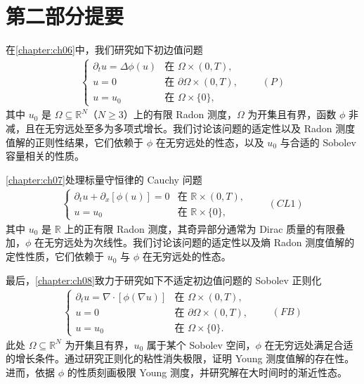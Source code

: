 \documentclass[../main.tex]{subfiles}
\begin{document}
\section*{第二部分提要}\label{section:part2-outline}

在\cref{chapter:ch06}中，我们研究如下初边值问题
\begin{align*}
\begin{cases}
\partial_t u = \Delta\phi(u) & \text{在 }\Omega\times(0,T),\\
u=0 & \text{在 }\partial\Omega\times(0,T),\\
u=u_0 & \text{在 }\Omega\times\{0\},
\end{cases}
\qquad(P)
\end{align*}
其中 $u_0$ 是 $\Omega\subseteq\mathbb{R}^N$（$N\geqslant3$）上的有限 Radon 测度，$\Omega$ 为开集且有界，函数 $\phi$ 非减，且在无穷远处至多为多项式增长。我们讨论该问题的适定性以及 Radon 测度值解的正则性结果，它们依赖于 $\phi$ 在无穷远处的性态，以及 $u_0$ 与合适的 Sobolev 容量相关的性质。

\cref{chapter:ch07}处理标量守恒律的 Cauchy 问题
\begin{align*}
\begin{cases}
\partial_t u + \partial_x[\phi(u)] = 0 & \text{在 }\mathbb{R}\times(0,T),\\
u=u_0 & \text{在 }\mathbb{R}\times\{0\},
\end{cases}
\qquad(CL1)
\end{align*}
其中 $u_0$ 是 $\mathbb{R}$ 上的正有限 Radon 测度，其奇异部分通常为 Dirac 质量的有限叠加，$\phi$ 在无穷远处为次线性。我们讨论该问题的适定性以及熵 Radon 测度值解的定性性质，它们依赖于 $u_0$ 与 $\phi$ 在无穷远处的性态。

最后，\cref{chapter:ch08}致力于研究如下不适定初边值问题的 Sobolev 正则化
\begin{align*}
\begin{cases}
\partial_t u = \nabla\cdot[\phi(\nabla u)] & \text{在 }\Omega\times(0,T),\\
u=0 & \text{在 }\partial\Omega\times(0,T),\\
u=u_0 & \text{在 }\Omega\times\{0\}.
\end{cases}
\qquad(FB)
\end{align*}
此处 $\Omega\subseteq\mathbb{R}^N$ 为开集且有界，$u_0$ 属于某个 Sobolev 空间，$\phi$ 在无穷远处满足合适的增长条件。通过研究正则化的粘性消失极限，证明 Young 测度值解的存在性。进而，依据 $\phi$ 的性质刻画极限 Young 测度，并研究解在大时间时的渐近性态。
\end{document}
